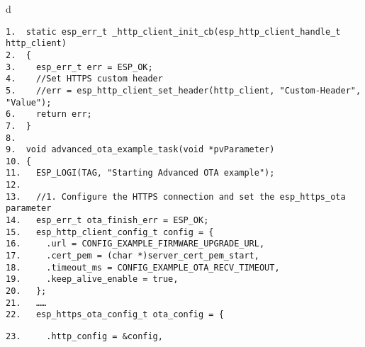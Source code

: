 \documentclass[a4paper,12pt]{book}
\begin{document}
\begin{codebloc}
\begin{tabular}{d}
\vspace{2pt}
\begin{verbatim}
1.  static esp_err_t _http_client_init_cb(esp_http_client_handle_t http_client)
2.  {
3.    esp_err_t err = ESP_OK;
4.    //Set HTTPS custom header
5.    //err = esp_http_client_set_header(http_client, "Custom-Header", "Value");
6.    return err;
7.  }
8.
9.  void advanced_ota_example_task(void *pvParameter)
10. {
11.   ESP_LOGI(TAG, "Starting Advanced OTA example");
12.
13.   //1. Configure the HTTPS connection and set the esp_https_ota parameter
14.   esp_err_t ota_finish_err = ESP_OK;
15.   esp_http_client_config_t config = {
16.     .url = CONFIG_EXAMPLE_FIRMWARE_UPGRADE_URL,
17.     .cert_pem = (char *)server_cert_pem_start,
18.     .timeout_ms = CONFIG_EXAMPLE_OTA_RECV_TIMEOUT,
19.     .keep_alive_enable = true,
20.   };
21.   ……
22.   esp_https_ota_config_t ota_config = {
\end{verbatim}
\verb|23.     .http_config = &config,|
\end{tabular}
\end{codebloc}
\end{document}
